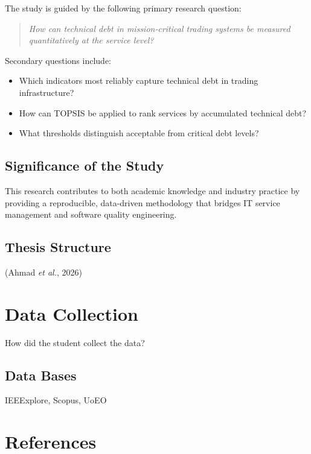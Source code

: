 \documentclass[
  11pt,
  letterpaper,
  11pt,
  english,
  onehalfspacing,
  headsepline]{MastersDoctoralThesis}
\providecommand{\tightlist}{%
  \setlength{\itemsep}{0pt}\setlength{\parskip}{0pt}}
\begin{document}
The study is guided by the following primary research question:

\begin{quote}
\emph{How can technical debt in mission-critical trading systems be
measured quantitatively at the service level?}
\end{quote}

Secondary questions include:

\begin{itemize}
\tightlist
\item
  Which indicators most reliably capture technical debt in trading
  infrastructure?
\item
  How can TOPSIS be applied to rank services by accumulated technical
  debt?
\item
  What thresholds distinguish acceptable from critical debt levels?
\end{itemize}

\section{Significance of the Study}\label{significance-of-the-study-1}

This research contributes to both academic knowledge and industry
practice by providing a reproducible, data-driven methodology that
bridges IT service management and software quality engineering.

\section{Thesis Structure}\label{thesis-structure-1}

(Ahmad \emph{et al.}, 2026)


\chapter{Data Collection}\label{data-collection}

How did the student collect the data?

\section{Data Bases}\label{data-bases}

IEEExplore, Scopus, UoEO


\chapter*{References}\label{references}
\end{document}
